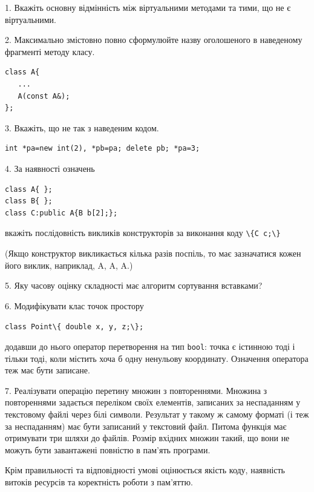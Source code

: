 \documentclass[12pt, ukrainian]{article}
\def\code#1{\Verb!#1!}
\begin{document}
{%
1. Вкажіть основну відмінність між віртуальними методами та тими, що не є віртуальними.%
\par
\vspace{2mm}
2. Максимально змістовно повно сформулюйте назву оголошеного в наведеному фрагменті методу класу.
\vspace{-3mm}
\begin{verbatim}class A{
   ...
   A(const A&);
};\end{verbatim}
\vspace{-3mm}
\par
\vspace{2mm}
3. Вкажіть, що не так з наведеним кодом.
\vspace{-3mm}
\begin{verbatim}int *pa=new int(2), *pb=pa; delete pb; *pa=3;\end{verbatim}
\vspace{-3mm}
\par
\vspace{2mm}
4. За наявності означень
\vspace{-3mm}
\begin{verbatim}
class A{ };
class B{ };
class C:public A{B b[2];};\end{verbatim}
\vspace{-3mm}
вкажіть послідовність викликів конструкторів за виконання коду \code{\{C c;\}} 

(Якщо конструктор викликається кілька разів поспіль, то має зазначатися кожен його виклик, наприклад, A, A, A.)

\vspace{2mm}
5. Яку часову оцінку складності має алгоритм сортування вставками?
\par
\vspace{2mm}
6. Модифікувати клас точок простору 

\qquad\code{class Point\{ double x, y, z;\};}


додавши до нього оператор перетворення на тип \code{bool}: точка є істинною тоді і тільки тоді, коли містить хоча б одну ненульову координату. Означення оператора теж має бути записане.%
\par
\vspace{2mm}
7. 
Реалізувати операцію перетину множин з повтореннями. Множина з повтореннями задається переліком своїх елементів, записаних за неспаданням у текстовому файлі через білі символи. Результат у такому ж самому форматі (і теж за неспаданням) має бути записаний у текстовий файл. Питома функція має отримувати три шляхи до файлів. Розмір вхідних множин такий, що вони не можуть бути завантажені повністю в пам’ять програми.

Крім правильності та відповідності умові оцінюється якість коду, наявність витоків ресурсів та коректність роботи з пам'яттю. 

}
\end{document}
